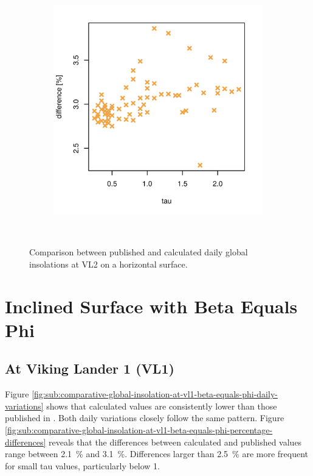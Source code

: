 \begin{figure}[H]
\begin{subfigure}[t]{\subfigureWidth}
            \includegraphics[height=\graphicsHeight]{sections/appendix/insolation-calculation-verification/plots/hh-diff-bet-exp-calc-at-vl2.png}
            \label{fig:sub:comparative-global-insolation-at-vl2-horizontal-percentage-differences}
    \end{subfigure}\\[0.8ex]
    \caption{Comparison between published and calculated daily global insolations at \ac{VL2} on a horizontal surface.}
    \label{fig:plot:comparative-global-insolation-at-vl2-horizontal}
\vspace{-2ex}
\end{figure}
\clearpage

\section{Inclined Surface with Beta Equals Phi}
\subsection{At Viking Lander 1 (VL1)}
Figure \ref{fig:sub:comparative-global-insolation-at-vl1-beta-equals-phi-daily-variations} shows that calculated values are consistently lower than those published in . Both daily variations closely follow the same pattern. Figure \ref{fig:sub:comparative-global-insolation-at-vl1-beta-equals-phi-percentage-differences} reveals that the differences between calculated and published values range between \SI{2.1}{\percent} and \SI{3.1}{\percent}. Differences larger than \SI{2.5}{\percent} are more frequent for small tau values, particularly below 1.

